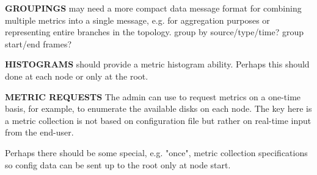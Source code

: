 \textbf{GROUPINGS}
\dcamp may need a more compact data message format for combining multiple metrics into a single message, e.g. for
aggregation purposes or representing entire branches in the topology.
group by source/type/time?
group start/end frames?

\textbf{HISTOGRAMS}
\dcamp should provide a metric histogram ability. Perhaps this should done at each node or only at the root.

\textbf{METRIC REQUESTS}
The admin can use \dcamp to request metrics on a one-time basis, for example, to enumerate the available disks on each
node. The key here is a metric collection is not based on configuration file but rather on real-time input from the
end-user.

Perhaps there should be some special, e.g. "once", metric collection specifications so config data can be sent up to the
root only at node start.

